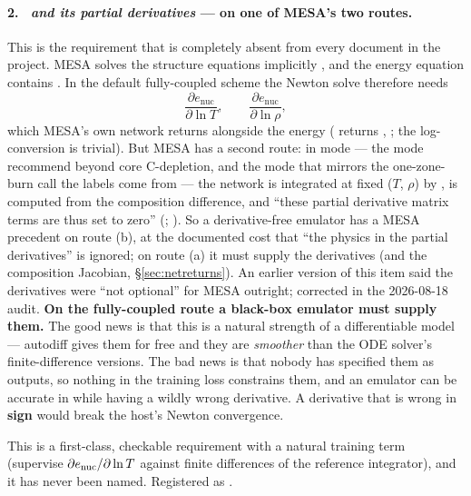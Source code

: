 \paragraph{2.\ \enuc{} \emph{and its partial derivatives} --- on one of MESA's
two routes.} This is the requirement that is completely absent from every
document in the project. MESA solves the structure equations implicitly
\citep[\S 6]{paxton2011}, and the energy equation contains \enuc. In the default
fully-coupled scheme the Newton solve therefore needs
%
\begin{equation}
\frac{\partial e_{\mathrm{nuc}}}{\partial \ln T},\qquad
\frac{\partial e_{\mathrm{nuc}}}{\partial \ln \rho},
\label{eq:enucderivs}
\end{equation}
%
which MESA's own network returns alongside the energy ( returns
, ; the log-conversion is
trivial). But MESA has a second route: in  mode --- the
mode \citet[\S 10.2]{jermyn2023} recommend beyond core C-depletion, and the mode
that mirrors the one-zone-burn call the labels come from --- the network is
integrated at fixed ($T$, $\rho$) by , \epsnuc{} is
computed from the composition difference, and ``these partial derivative matrix
terms are thus set to zero'' (\citealt[\S 10.2]{jermyn2023};
). So a derivative-free emulator has a MESA
precedent on route (b), at the documented cost that ``the physics in the
partial derivatives'' is ignored; on route (a) it must supply the derivatives
(and the composition Jacobian, \S\ref{sec:netreturns}). An earlier version of
this item said the derivatives were ``not optional'' for MESA outright;
corrected in the 2026-08-18 audit. \textbf{On the fully-coupled route a
black-box emulator must supply them.} The good news is that this is a natural
strength of a differentiable model --- autodiff gives them for free and they
are \emph{smoother} than the ODE solver's finite-difference versions. The bad
news is that nobody has specified them as outputs, so nothing in the training
loss constrains them, and an emulator can be accurate in \enuc{} while having a
wildly wrong derivative. A derivative that is wrong in \textbf{sign} would break
the host's Newton convergence.

This is a first-class, checkable requirement with a natural training term
(supervise $\partial e_{\mathrm{nuc}}/\partial \ln T$ against finite differences of the
reference integrator), and it has never been named. Registered as .

